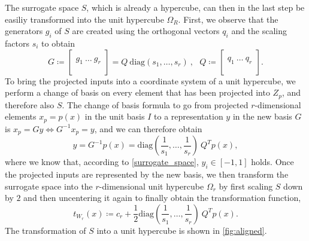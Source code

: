 \documentclass[
  a4paper,  %
  twoside,  %
  bibliography=totoc,
  headsepline,
  cleardoublepage=empty,
  parskip=half,
  draft=false
]{scrbook}
\begin{document}
The surrogate space $S$, which is already a hypercube, can then in the last step be easiliy transformed into the unit hypercube $\Omega_R$.
First, we observe that the generators $g_i$ of $S$ are created using the orthogonal vectors $q_i$ and the scaling factors $s_i$ to obtain
\begin{equation}
G \coloneqq \begin{bmatrix}
  \\
    g_1 ~ \dots  ~ g_r\\
    \\
  \end{bmatrix}=Q ~ \text{diag}(s_1, \dots, s_r) ~, ~~~
Q \coloneqq \begin{bmatrix}
  \\
    q_1 ~ \dots  ~ q_r\\
    \\
  \end{bmatrix}.
\end{equation}
%
To bring the projected inputs into a coordinate system of a unit hypercube, we perform a change of basis on every element that has been projected into $Z_p$, and therefore also $S$.
The change of basis formula to go from projected $r$-dimensional elements $x_p=p(x)$ in the unit basis $I$ to a representation $y$ in the new basis $G$ is $x_p=Gy \Leftrightarrow G^{-1} x_p=y$, and we can therefore obtain
\begin{equation}
y=G^{-1} p(x)=\text{diag}\left(\frac{1}{s_1}, \dots, \frac{1}{s_r}\right) ~Q^T p(x),
\label{alignment}
\end{equation}
where we know that, according to \cref{surrogate_space}, $y_i \in [-1,1]$ holds.
Once the projected inputs are represented by the new basis, we then transform the surrogate space into the $r$-dimensional unit hypercube $\Omega_r$ by first scaling $S$ down by $2$ and then uncentering it again to finally obtain the transformation function,
\begin{equation}
t_{W_r}(x) \coloneqq c_r + \frac{1}{2} \text{diag}\left(\frac{1}{s_1}, \dots, \frac{1}{s_r}\right) ~Q^T p(x).
\label{linear_trans}
\end{equation}
The transformation of $S$ into a unit hypercube is shown in \cref{fig:aligned}.
\end{document}
